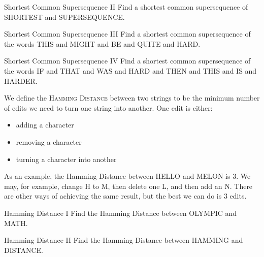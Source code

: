 \documentclass[12pt,letterpaper]{article}
\begin{document}
\begin{problem}{Shortest Common Supersequence II}
 Find a shortest common supersequence of SHORTEST and SUPERSEQUENCE.
\end{problem}

\begin{problem}{Shortest Common Supersequence III}
 Find a shortest common supersequence of the words THIS and MIGHT and BE and
 QUITE and HARD.
\end{problem}

\begin{problem}{Shortest Common Supersequence IV}
 Find a shortest common supersequence of the words IF and THAT and WAS and HARD
 and THEN and THIS and IS and HARDER.
\end{problem}

\vspace{2em}

We define the \textsc{Hamming Distance} between two strings to be the minimum
number of edits we need to turn one string into another. One edit is either:
\begin{itemize}
 \item adding a character
 \item removing a character
 \item turning a character into another
\end{itemize}

As an example, the Hamming Distance between HELLO and MELON is $3$. We may,
for example, change H to M, then delete one L, and then add an N. There are
other ways of achieving the same result, but the best we can do is $3$ edits.

\begin{problem}{Hamming Distance I}
 Find the Hamming Distance between OLYMPIC and MATH.
\end{problem}

\begin{problem}{Hamming Distance II}
 Find the Hamming Distance between HAMMING and DISTANCE.
\end{problem}
\end{document}
